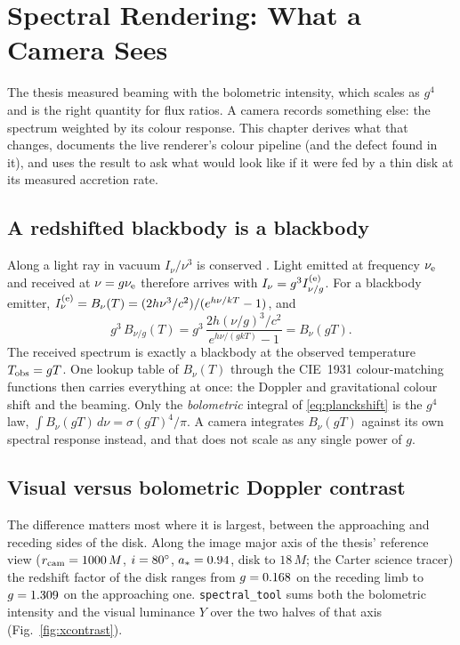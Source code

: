 \chapter{Spectral Rendering: What a Camera Sees}
\label{ch:xspectral}

The thesis measured beaming with the bolometric intensity, which scales as
$g^4$ and is the right quantity for flux ratios. A camera records something
else: the spectrum weighted by its colour response. This chapter derives
what that changes, documents the live renderer's colour pipeline (and the
defect found in it), and uses the result to ask what \sgra{} would look like
if it were fed by a thin disk at its measured accretion rate.

\section{A redshifted blackbody is a blackbody}
\label{sec:planckshift}

Along a light ray in vacuum $I_\nu/\nu^3$ is conserved
\citep[e.g.][]{RybickiLightman1979, MTW1973}. Light emitted at frequency
$\nu_{\rm e}$ and received at $\nu = g\nu_{\rm e}$ therefore arrives with
$I_\nu = g^3 I_{\nu/g}^{\rm (e)}$. For a blackbody emitter,
$I_\nu^{\rm (e)} = B_\nu(T) = (2h\nu^3/c^2)/(e^{h\nu/kT}-1)$, and
\begin{equation}
g^3\,B_{\nu/g}(T)
= g^3\,\frac{2h(\nu/g)^3/c^2}{e^{h\nu/(gkT)}-1}
= B_\nu(gT) .
\label{eq:planckshift}
\end{equation}
The received spectrum is exactly a blackbody at the observed temperature
$T_{\rm obs} = gT$. One lookup table of $B_\nu(T)$ through the CIE~1931
colour-matching functions \citep[fitted as in][]{WymanSloanShirley2013} then
carries everything at once: the Doppler and gravitational colour shift and the
beaming. Only the \emph{bolometric} integral of \eqref{eq:planckshift} is the
$g^4$ law, $\int B_\nu(gT)\,d\nu = \sigma (gT)^4/\pi$. A camera integrates
$B_\nu(gT)$ against its own spectral response instead, and that does not scale
as any single power of $g$.

\section{Visual versus bolometric Doppler contrast}
\label{sec:viscontrast}

The difference matters most where it is largest, between the approaching and
receding sides of the disk. Along the image major axis of the thesis'
reference view ($r_{\rm cam} = 1000\,M$, $i = 80^\circ$, $a_* = 0.94$, disk
to $18\,M$; the Carter science tracer) the redshift factor of the disk ranges
from $g = 0.168$ on the receding limb to $g = 1.309$ on the approaching one.
\texttt{spectral\_tool} sums both the bolometric intensity and the visual
luminance $Y$ over the two halves of that axis (Fig.~\ref{fig:xcontrast}).

